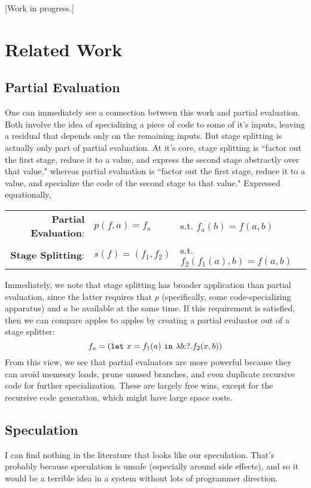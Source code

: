\documentclass[11pt]{article}
\newcommand {\letin} [3] {{\tt let}~{#1} = {#2}~{\tt in}~{#3}}
\newcommand {\lam} [3] {\lambda{#1}\mathrm{:}{#2}.{#3}}
\begin{document}
[Work in progress.]

\section{Related Work}
\label{sec:lit}
\subsection{Partial Evaluation}
One can immediately see a connection between this work and partial evaluation. Both involve the idea of specializing a piece of code to some of it's inputs, leaving a residual that depends only on the remaining inputs.  But stage splitting is actually only part of partial evaluation.  At it's core, stage splitting is ``factor out the first stage, reduce it to a value, and express the second stage abstractly over that value," whereas partial evaluation is ``factor out the first stage, reduce it to a value, and specialize the code of the second stage to that value."  Expressed equationally,
\begin{center}
\begin{tabular}{rll}
{\bf Partial Evaluation}:& $p(f,a)=f_a$ &s.t. $f_a(b) = f(a,b)$ \\
{\bf Stage Splitting}:& $s(f)=(f_1,f_2)$ &s.t. $f_2(f_1(a),b) = f(a,b)$
\end{tabular}
\end{center}
Immediately, we note that stage splitting has broader application than partial evaluation, since the latter requires that $p$ (specifically, some code-specializing apparatus) and $a$ be available at the same time.  If this requirement is satisfied, then we can compare apples to apples by creating a partial evaluator out of a stage splitter:
	\[f_a = (\letin {x}{f_1(a)}{\lam{b}{?}{f_2(x,b)}})\]
From this view, we see that partial evaluators are more powerful because they can avoid memeory loads, prune unused branches, and even duplicate recursive code for further specialization.  These are largely free wins, except for the recursive code generation, which might have large space costs.

\subsection{Speculation}

I can find nothing in the literature that looks like our speculation.  That's probably because speculation is unsafe (especially around side effects), and so it would be a terrible idea in a system without lots of programmer direction.
\end{document}
